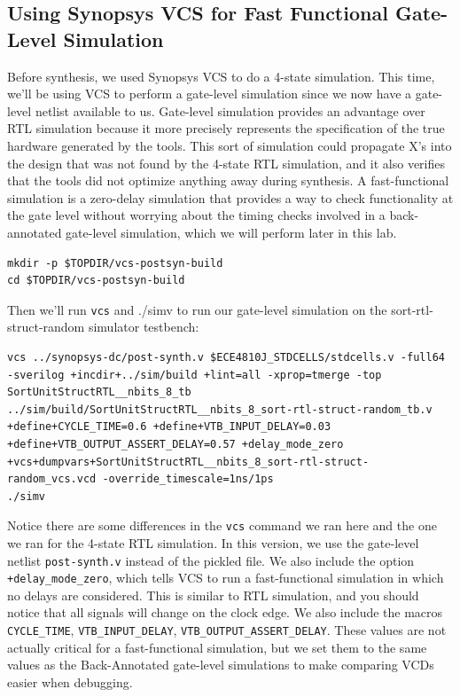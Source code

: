 \documentclass[a4paper,12pt,twoside]{article}
\begin{document}
\subsection{Using Synopsys VCS for Fast Functional Gate-Level Simulation}
Before synthesis, we used Synopsys VCS to do a 4-state simulation. This time, we’ll be using VCS to perform a gate-level simulation since we now have a gate-level netlist available to us. Gate-level simulation provides an advantage over RTL simulation because it more precisely represents the specification of the true hardware generated by the tools. This sort of simulation could propagate X’s into the design that was not found by the 4-state RTL simulation, and it also verifies that the tools did not optimize anything away during synthesis. A fast-functional simulation is a zero-delay simulation that provides a way to check functionality at the gate level without worrying about the timing checks involved in a back-annotated gate-level simulation, which we will perform later in this lab.
\begin{verbatim}
mkdir -p $TOPDIR/vcs-postsyn-build
cd $TOPDIR/vcs-postsyn-build
\end{verbatim}
Then we’ll run \texttt{vcs} and ./simv to run our gate-level simulation on the sort-rtl-struct-random simulator testbench:
\begin{verbatim}
vcs ../synopsys-dc/post-synth.v $ECE4810J_STDCELLS/stdcells.v -full64 -sverilog +incdir+../sim/build +lint=all -xprop=tmerge -top SortUnitStructRTL__nbits_8_tb ../sim/build/SortUnitStructRTL__nbits_8_sort-rtl-struct-random_tb.v +define+CYCLE_TIME=0.6 +define+VTB_INPUT_DELAY=0.03 +define+VTB_OUTPUT_ASSERT_DELAY=0.57 +delay_mode_zero +vcs+dumpvars+SortUnitStructRTL__nbits_8_sort-rtl-struct-random_vcs.vcd -override_timescale=1ns/1ps
./simv
\end{verbatim}
Notice there are some differences in the \texttt{vcs} command we ran here and the one we ran for the 4-state RTL simulation. In this version, we use the gate-level netlist \texttt{post-synth.v} instead of the pickled file. We also include the option \texttt{+delay\_mode\_zero}, which tells VCS to run a fast-functional simulation in which no delays are considered. This is similar to RTL simulation, and you should notice that all signals will change on the clock edge. We also include the macros \texttt{CYCLE\_TIME}, \texttt{VTB\_INPUT\_DELAY}, \texttt{VTB\_OUTPUT\_ASSERT\_DELAY}. These values are not actually critical for a fast-functional simulation, but we set them to the same values as the Back-Annotated gate-level simulations to make comparing VCDs easier when debugging.
\end{document}
